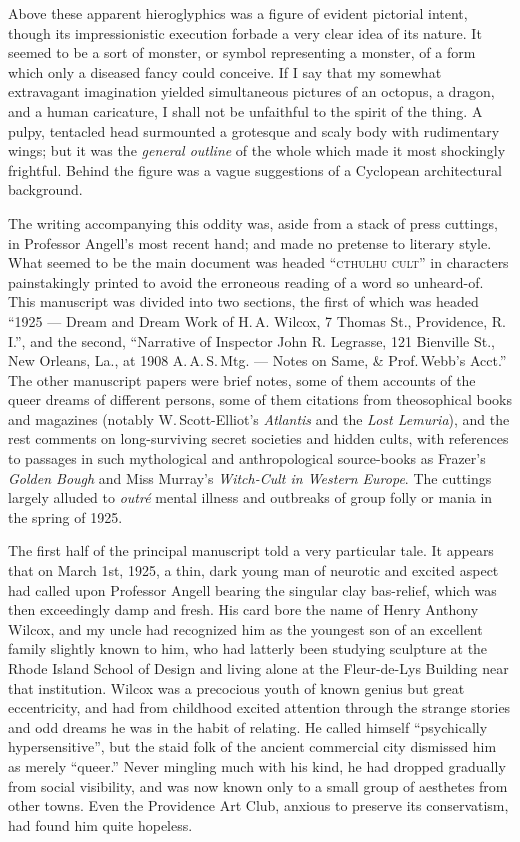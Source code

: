 \begin{pages}
\begin{Leftside}
Above these apparent hieroglyphics was a figure of evident pictorial
intent, though its impressionistic execution forbade a very clear idea
of its nature. It seemed to be a sort of monster, or symbol representing
a monster, of a form which only a diseased fancy could conceive. If I
say that my somewhat extravagant imagination yielded simultaneous
pictures of an octopus, a dragon, and a human caricature, I shall not be
unfaithful to the spirit of the thing. A pulpy, tentacled head
surmounted a grotesque and scaly body with rudimentary wings; but it was
the \emph{general outline} of the whole which made it most shockingly
frightful. Behind the figure was a vague suggestions of a Cyclopean
architectural background.

The writing accompanying this oddity was, aside from a stack of press
cuttings, in Professor Angell's most recent hand; and made no pretense
to literary style. What seemed to be the main document was headed
``\textsc{cthulhu cult}'' in characters painstakingly printed to avoid the
erroneous reading of a word so unheard-of. This manuscript was divided
into two sections, the first of which was headed ``1925 --- Dream
and Dream Work of H.\,A. Wilcox, 7 Thomas St., Providence, R.\,I.'', and the
second, ``Narrative of Inspector John R. Legrasse, 121 Bienville St.,
New Orleans, La., at 1908 A.\,A.\,S.\,Mtg. --- Notes on Same, \& Prof.\,Webb's
Acct.'' The other manuscript papers were brief notes, some of them
accounts of the queer dreams of different persons, some of them
citations from theosophical books and magazines (notably W.\,Scott-Elliot's \emph{Atlantis} and the \emph{Lost Lemuria}), and the rest comments on
long-surviving secret societies and hidden cults, with references to
passages in such mythological and anthropological source-books as
Frazer's \emph{Golden Bough} and Miss Murray's \emph{Witch-Cult in Western Europe}.
The cuttings largely alluded to \emph{outré} mental illness and outbreaks of
group folly or mania in the spring of 1925.

The first half of the principal manuscript told a very particular tale.
It appears that on March 1st, 1925, a thin, dark young man of neurotic
and excited aspect had called upon Professor Angell bearing the singular
clay bas-relief, which was then exceedingly damp and fresh. His card
bore the name of Henry Anthony Wilcox, and my uncle had recognized him
as the youngest son of an excellent family slightly known to him, who
had latterly been studying sculpture at the Rhode Island School of
Design and living alone at the Fleur-de-Lys Building near that
institution. Wilcox was a precocious youth of known genius but great
eccentricity, and had from childhood excited attention through the
strange stories and odd dreams he was in the habit of relating. He
called himself ``psychically hypersensitive'', but the staid folk of the
ancient commercial city dismissed him as merely ``queer.'' Never
mingling much with his kind, he had dropped gradually from social
visibility, and was now known only to a small group of aesthetes from
other towns. Even the Providence Art Club, anxious to preserve its
conservatism, had found him quite hopeless.


\end{Leftside}
\end{pages}
